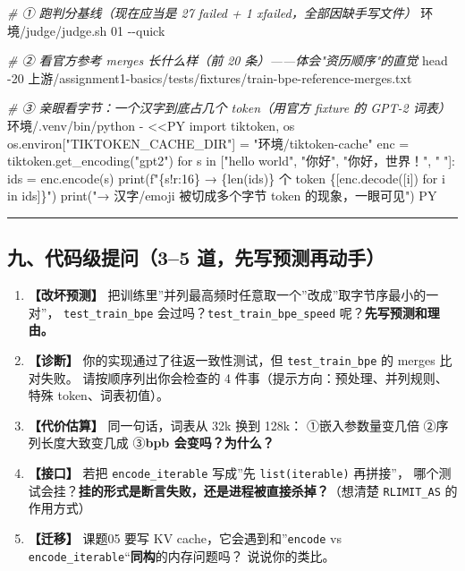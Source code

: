 \documentclass[
  chinese,
  11pt,
]{ctexart}
\newenvironment{Shaded}{}{}
\newcommand{\AttributeTok}[1]{\textcolor[rgb]{0.49,0.56,0.16}{#1}}
\newcommand{\CommentTok}[1]{\textcolor[rgb]{0.38,0.63,0.69}{\textit{#1}}}
\newcommand{\ExtensionTok}[1]{#1}
\newcommand{\FunctionTok}[1]{\textcolor[rgb]{0.02,0.16,0.49}{#1}}
\newcommand{\NormalTok}[1]{#1}
\newcommand{\OperatorTok}[1]{\textcolor[rgb]{0.40,0.40,0.40}{#1}}
\newcommand{\StringTok}[1]{\textcolor[rgb]{0.25,0.44,0.63}{#1}}
\providecommand{\tightlist}{%
  \setlength{\itemsep}{0pt}\setlength{\parskip}{0pt}}
\begin{document}
\begin{Shaded}
\begin{Highlighting}[]
\CommentTok{\# ① 跑判分基线（现在应当是 27 failed + 1 xfailed，全部因缺手写文件）}
\ExtensionTok{环境/judge/judge.sh}\NormalTok{ 01 }\AttributeTok{{-}{-}quick}

\CommentTok{\# ② 看官方参考 merges 长什么样（前 20 条）——体会"资历顺序"的直觉}
\FunctionTok{head} \AttributeTok{{-}20}\NormalTok{ 上游/assignment1{-}basics/tests/fixtures/train{-}bpe{-}reference{-}merges.txt}

\CommentTok{\# ③ 亲眼看字节：一个汉字到底占几个 token（用官方 fixture 的 GPT{-}2 词表）}
\ExtensionTok{环境/.venv/bin/python} \AttributeTok{{-}} \OperatorTok{\textless{}\textless{}\textquotesingle{}PY\textquotesingle{}}
\StringTok{import tiktoken, os}
\StringTok{os.environ["TIKTOKEN\_CACHE\_DIR"] = "环境/tiktoken{-}cache"}
\StringTok{enc = tiktoken.get\_encoding("gpt2")}
\StringTok{for s in ["hello world", "你好", "你好，世界！", "🦙"]:}
\StringTok{    ids = enc.encode(s)}
\StringTok{    print(f"\{s!r:16\} → \{len(ids)\} 个 token  \{[enc.decode([i]) for i in ids]\}")}
\StringTok{print("→ 汉字/emoji 被切成多个字节 token 的现象，一眼可见")}
\OperatorTok{PY}
\end{Highlighting}
\end{Shaded}

\begin{center}\rule{0.5\linewidth}{0.5pt}\end{center}

\subsection{九、代码级提问（3--5 道，先写预测再动手）}\label{ux4e5dux4ee3ux7801ux7ea7ux63d0ux95ee35-ux9053ux5148ux5199ux9884ux6d4bux518dux52a8ux624b}

\begin{enumerate}
\def\labelenumi{\arabic{enumi}.}
\tightlist
\item
  \textbf{【改坏预测】} 把训练里''并列最高频时任意取一个''改成''取字节序最小的一对''， \texttt{test\_train\_bpe} 会过吗？\texttt{test\_train\_bpe\_speed} 呢？\textbf{先写预测和理由。}
\item
  \textbf{【诊断】} 你的实现通过了往返一致性测试，但 \texttt{test\_train\_bpe} 的 merges 比对失败。 请按顺序列出你会检查的 4 件事（提示方向：预处理、并列规则、特殊 token、词表初值）。
\item
  \textbf{【代价估算】} 同一句话，词表从 32k 换到 128k： ①嵌入参数量变几倍 ②序列长度大致变几成 ③\textbf{bpb 会变吗？为什么？}
\item
  \textbf{【接口】} 若把 \texttt{encode\_iterable} 写成''先 \texttt{list(iterable)} 再拼接''， 哪个测试会挂？\textbf{挂的形式是断言失败，还是进程被直接杀掉？}（想清楚 \texttt{RLIMIT\_AS} 的作用方式）
\item
  \textbf{【迁移】} 课题05 要写 KV cache，它会遇到和''\texttt{encode} vs \texttt{encode\_iterable}``\textbf{同构}的内存问题吗？ 说说你的类比。
\end{enumerate}
\end{document}
